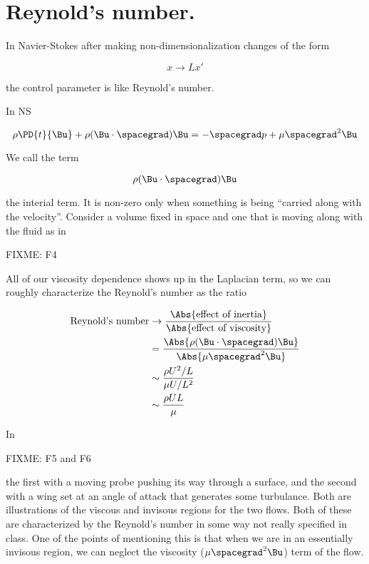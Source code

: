 \section{Reynold's number.}

In Navier-Stokes after making non-dimensionalization changes of the form

\begin{equation}\label{eqn:inclinedFlowWithoutConstantHeightAssumption:150}
x \rightarrow L x'
\end{equation}

the control parameter is like Reynold's number.

In NS

\begin{equation}\label{eqn:inclinedFlowWithoutConstantHeightAssumption:170}
\rho \PD{t}{\Bu} + \rho ( \Bu \cdot \spacegrad ) \Bu = - \spacegrad p + \mu \spacegrad^2 \Bu
\end{equation}

We call the term

\begin{equation}\label{eqn:inclinedFlowWithoutConstantHeightAssumption:190}
\rho ( \Bu \cdot \spacegrad ) \Bu
\end{equation}

the interial term.  It is non-zero only when something is being ``carried along with the velocity''.  Consider a volume fixed in space and one that is moving along with the fluid as in

FIXME: F4

All of our viscosity dependence shows up in the Laplacian term, so we can roughly characterize the Reynold's number as the ratio

\begin{align*}
\text{Reynold's number}
&\rightarrow
\frac{\Abs{\text{effect of inertia}}}{\Abs{\text{effect of viscosity}}}  \\
&=
\frac{ \Abs{\rho ( \Bu \cdot \spacegrad ) \Bu } }{\Abs{ \mu \spacegrad^2 \Bu}} \\
&\sim
\frac{ \rho U^2/L }{\mu U/L^2} \\
&\sim
\frac{ \rho U L }{\mu }
\end{align*}

In 

FIXME: F5 and F6

the first with a moving probe pushing its way through a surface, and the second with a wing set at an angle of attack that generates some turbulance.  Both are illustrations of the viscous and invisous regions for the two flows.  Both of these are characterized by the Reynold's number in some way not really specified in class.  One of the points of mentioning this is that when we are in an essentially invisous region, we can neglect the viscosity ($\mu \spacegrad^2 \Bu$) term of the flow.

